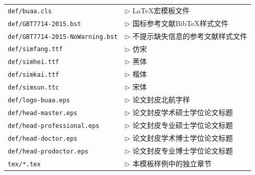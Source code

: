 \begin{tabular}{ll}
 \verb|def/buaa.cls |                 & $\triangleright$ LaTeX宏模板文件 \\
 \verb|def/GBT7714-2015.bst|      & $\triangleright$ 国标参考文献BibTeX样式文件 \\
 \verb|def/GBT7714-2015-NoWarning.bst|      & $\triangleright$ 不提示缺失信息的参考文献样式文件 \\
 \verb|def/simfang.ttf|           & $\triangleright$ 仿宋\\
 \verb|def/simhei.ttf|            & $\triangleright$ 黑体\\
 \verb|def/simkai.ttf|            & $\triangleright$ 楷体\\
 \verb|def/simsun.ttc|            & $\triangleright$ 宋体\\
 \verb|def/logo-buaa.eps|         & $\triangleright$ 论文封皮北航字样 \\
 \verb|def/head-master.eps|       & $\triangleright$ 论文封皮学术硕士学位论文标题\\
 \verb|def/head-professional.eps| & $\triangleright$ 论文封皮专业硕士学位论文标题\\
 \verb|def/head-doctor.eps|       & $\triangleright$ 论文封皮学术博士学位论文标题\\
 \verb|def/head-prodoctor.eps|    & $\triangleright$ 论文封皮专业博士学位论文标题\\
 \verb|tex/*.tex|                 & $\triangleright$ 本模板样例中的独立章节\\
\end{tabular}\\

